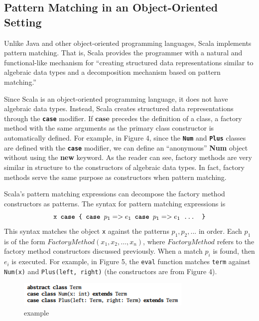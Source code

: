 \documentclass[jou,apacite]{IEEEtran}
\begin{document}
\subsection{Pattern Matching in an Object-Oriented Setting}
Unlike Java and other object-oriented programming languages, Scala implements
pattern matching. That is, Scala provides the programmer with a natural and
functional-like mechanism for ``creating structured data representations similar
to algebraic data types and a decomposition mechanism based on pattern
matching.''

Since Scala is an object-oriented programming language, it does not have
algebraic data types. Instead, Scala creates structured data representations
through the \texttt{\textbf{case}} modifier. If $\textbf{case}$ precedes the
definition of a class, a factory method with the same arguments as the primary
class constructor is automatically defined. For example, in Figure 4, since the
\texttt{\textbf{Num}} and \texttt{\textbf{Plus}} classes are defined with the
\texttt{\textbf{case}} modifier, we can define an “anonymous” \textbf{Num}
object without using the \textbf{new} keyword. As the reader can see, factory
methods are very similar in structure to the constructors of algebraic data
types. In fact, factory methods serve the same purpose as constructors when
pattern matching.

Scala's pattern matching expressions can decompose the factory method
constructors as patterns. The syntax for pattern matching expressions is
\[                              %
    \texttt{x \textbf{case} \{ \textbf{case} $p_1 => e_1$ \textbf{case} $p_1 => e_1$ ... \}}
\]
This syntax matches the object \texttt{x} against the patterns $p_1, p_2, ...$
in order. Each $p_1$ is of the form $FactoryMethod(x_1, x_2, …, x_n)$, where
$FactoryMethod$ refers to the factory method constructors discussed
previously. When a match $p_i$ is found, then $e_i$ is executed. For example, in
Figure 5, the \texttt{eval} function matches \texttt{term} against
\texttt{Num(x)} and \texttt{Plus(left, right)} (the constructors are from Figure
4).

\begin{figure}[h]
  \centering
  \includegraphics[width=\columnwidth]{abstract_class}
  \caption{example}
  \label{fig:example}
\end{figure}
\end{document}
